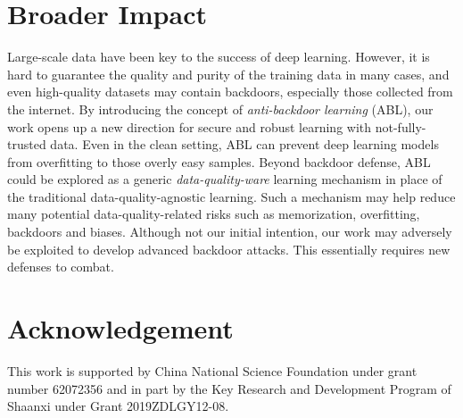 \section*{Broader Impact} \label{sec:6}
Large-scale data have been key to the success of deep learning. However, it is hard to guarantee the quality and purity of the training data in many cases, and even high-quality datasets may contain backdoors, especially those collected from the internet. By introducing the concept of \emph{anti-backdoor learning} (ABL), our work opens up a new direction for secure and robust learning with not-fully-trusted data. Even in the clean setting, ABL can prevent deep learning models from overfitting to those overly easy samples. Beyond backdoor defense, ABL could be explored as a generic \emph{data-quality-ware} learning mechanism in place of the traditional data-quality-agnostic learning. Such a mechanism may help reduce many potential data-quality-related risks such as memorization, overfitting, backdoors and biases. Although not our initial intention, our work may adversely be exploited to develop advanced backdoor attacks. This essentially requires new defenses to combat.

\section*{Acknowledgement}
This work is supported by China National Science Foundation under grant number 62072356 and in part by the Key Research and Development Program of Shaanxi under Grant 2019ZDLGY12-08.

\newpage

